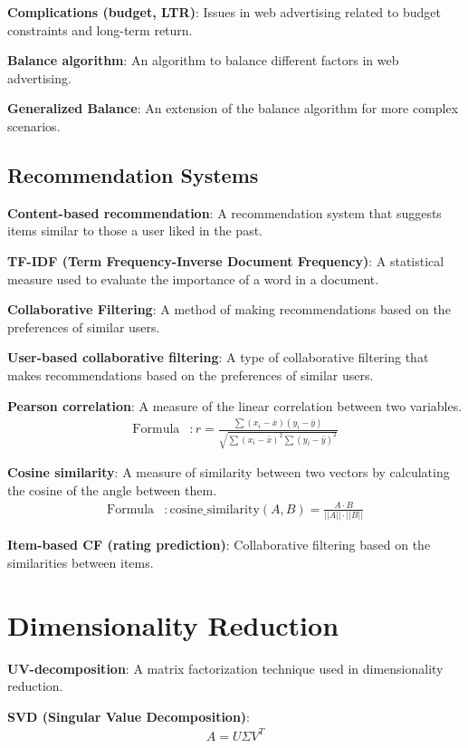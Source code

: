 \documentclass{article}
\begin{document}
\textbf{Complications (budget, LTR)}: Issues in web advertising related to budget constraints and long-term return.

\textbf{Balance algorithm}: An algorithm to balance different factors in web advertising.

\textbf{Generalized Balance}: An extension of the balance algorithm for more complex scenarios.

\subsection{Recommendation Systems}
\textbf{Content-based recommendation}: A recommendation system that suggests items similar to those a user liked in the past.

\textbf{TF-IDF (Term Frequency-Inverse Document Frequency)}: A statistical measure used to evaluate the importance of a word in a document.

\textbf{Collaborative Filtering}: A method of making recommendations based on the preferences of similar users.

\textbf{User-based collaborative filtering}: A type of collaborative filtering that makes recommendations based on the preferences of similar users.

\textbf{Pearson correlation}: A measure of the linear correlation between two variables.
\begin{align*}
    \text{Formula} &: r = \frac{\sum (x_i - \bar{x})(y_i - \bar{y})}{\sqrt{\sum (x_i - \bar{x})^2 \sum (y_i - \bar{y})^2}}
\end{align*}

\textbf{Cosine similarity}: A measure of similarity between two vectors by calculating the cosine of the angle between them.
\begin{align*}
    \text{Formula} &: \text{cosine\_similarity}(A, B) = \frac{A \cdot B}{||A|| \cdot ||B||}
\end{align*}

\textbf{Item-based CF (rating prediction)}: Collaborative filtering based on the similarities between items.

\section{Dimensionality Reduction}

\textbf{UV-decomposition}: A matrix factorization technique used in dimensionality reduction.

\textbf{SVD (Singular Value Decomposition)}:
\begin{align*}
    A = U \Sigma V^T
\end{align*}
\end{document}
